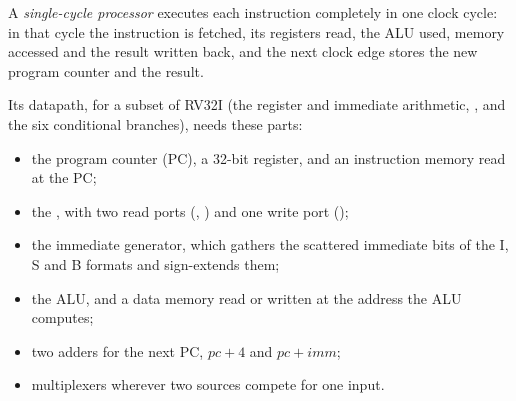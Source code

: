 \begin{definition}\label{def:b2:processor-and-pipelining:datapath}
A \emph{single-cycle processor} executes each instruction completely in one clock
cycle: in that cycle the instruction is fetched, its registers read, the ALU used, memory accessed and the result
written back, and the next clock edge stores the new program counter and the result.
\end{definition}

Its datapath, for a subset of RV32I (the register and immediate arithmetic, ,  and the six
conditional branches), needs these parts:
\begin{itemize}
\item the program counter (PC), a 32-bit register, and an instruction memory read at the PC;
\item the , with two read ports (, ) and one write port ();
\item the immediate generator, which gathers the scattered immediate bits of the I, S and B formats and sign-extends
them;
\item the ALU, and a data memory read or written at the address the ALU computes;
\item two adders for the next PC, $\mathit{pc} + 4$ and $\mathit{pc} + \mathit{imm}$;
\item multiplexers wherever two sources compete for one input.
\end{itemize}

